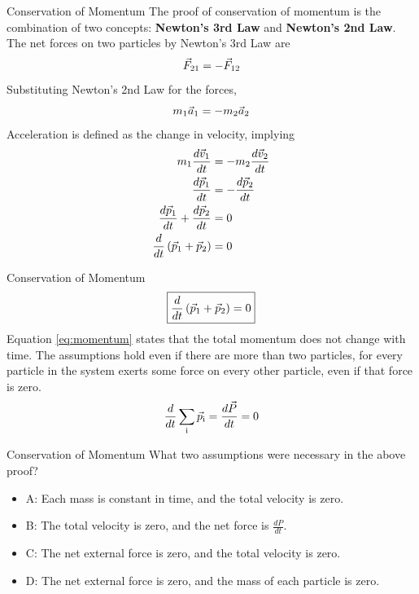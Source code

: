 \documentclass{beamer}
\begin{document}
\begin{frame}{Conservation of Momentum}
\small
The proof of conservation of momentum is the combination of two concepts: \alert{\textbf{Newton's 3rd Law}} and \alert{\textbf{Newton's 2nd Law}}.  The net forces on two particles by Newton's 3rd Law are 
\begin{equation}
\vec{F}_{\rm 21} = -\vec{F}_{\rm 12}
\end{equation}
Substituting Newton's 2nd Law for the forces,
\begin{equation}
m_{\rm 1} \vec{a}_{\rm 1} = -m_{\rm 2}\vec{a}_{\rm 2}
\end{equation}
Acceleration is defined as the change in velocity, implying
\begin{align}
m_{\rm 1} \frac{d\vec{v}_{\rm 1}}{dt} &= -m_{\rm 2} \frac{d\vec{v}_{\rm 2}}{dt} \\
\frac{d\vec{p}_{\rm 1}}{dt} &= -\frac{d\vec{p}_{\rm 2}}{dt} \\
\frac{d\vec{p}_{\rm 1}}{dt} + \frac{d\vec{p}_{\rm 2}}{dt} &= 0 \\
\frac{d}{dt}\left(\vec{p}_{\rm 1} + \vec{p}_{\rm 2}\right) &= 0
\end{align}
\end{frame}

\begin{frame}{Conservation of Momentum}
\begin{equation}
\boxed{
\frac{d}{dt}\left(\vec{p}_{\rm 1} + \vec{p}_{\rm 2}\right) = 0
} \label{eq:momentum}
\end{equation}
Equation \ref{eq:momentum} states that the total momentum does not change with time.  The assumptions hold even if there are more than two particles, for every particle in the system exerts some force on every other particle, even if that force is zero.
\begin{equation}
\frac{d}{dt}\sum_{\rm i} \vec{p}_{\rm i} = \frac{d\vec{P}}{dt} = 0
\end{equation}
\end{frame}

\begin{frame}{Conservation of Momentum}
What two assumptions were necessary in the above proof?
\begin{itemize}
\item A: Each mass is constant in time, and the total velocity is zero.
\item B: The total velocity is zero, and the net force is $\frac{dP}{dt}$.
\item C: The net external force is zero, and the total velocity is zero.
\item D: The net external force is zero, and the mass of each particle is zero.
\end{itemize}
\end{frame}
\end{document}
